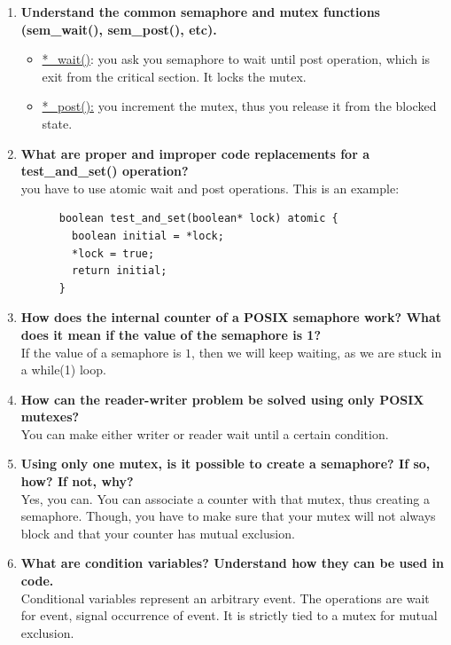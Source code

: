 \documentclass[a4paper]{article}
\begin{document}
\begin{enumerate}
  \item {\bf Understand the common semaphore and mutex functions (sem\_wait(), sem\_post(), etc). } \\
    \begin{itemize}
      \item \underline{*\_wait()}: you ask you semaphore to wait until post operation, which is exit from the critical section. It locks the mutex.
      \item \underline{*\_post():} you increment the mutex, thus you release it from the blocked state.
    \end{itemize}

  \item {\bf What are proper and improper code replacements for a test\_and\_set() operation? } \\
    you have to use atomic wait and post operations. This is an example:
    \begin{lstlisting}
      boolean test_and_set(boolean* lock) atomic {
        boolean initial = *lock;
        *lock = true;
        return initial;
      }
    \end{lstlisting}

  \item {\bf How does the internal counter of a POSIX semaphore work?  What does it mean if the value of the semaphore is 1?}\\
    If the value of a semaphore is $1$, then we will keep waiting, as we are stuck in a while(1) loop.

  \item {\bf How can the reader-writer problem be solved using only POSIX mutexes? }\\
    You can make either writer or reader wait until a certain condition.
  \item {\bf Using only one mutex, is it possible to create a semaphore?  If so, how?  If not, why?} \\
    Yes, you can. You can associate a counter with that mutex, thus creating a semaphore. Though, you have to make sure that your mutex will not always block and that your counter has mutual exclusion.

  \item {\bf What are condition variables?  Understand how they can be used in code. } \\
    Conditional variables represent an arbitrary event. The operations are wait for event, signal occurrence of event. It is strictly tied to a mutex for mutual exclusion.
\end{enumerate}
\end{document}
